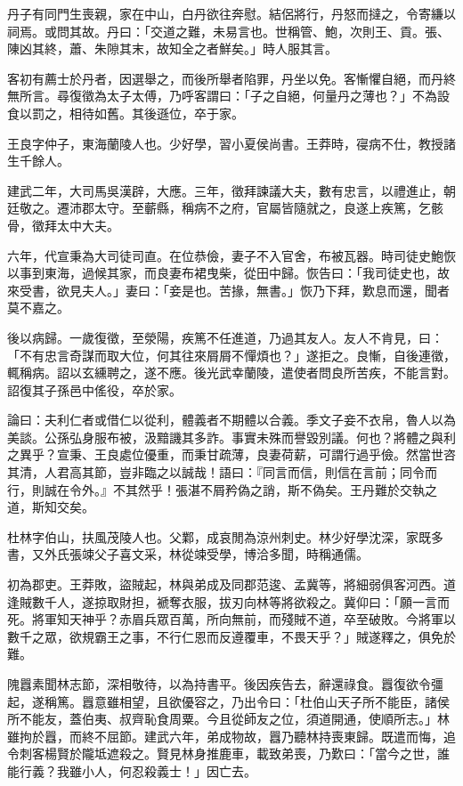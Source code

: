 \begin{pinyinscope}
丹子有同門生喪親，家在中山，白丹欲往奔慰。結侶將行，丹怒而撻之，令寄縑以祠焉。或問其故。丹曰：「交道之難，未易言也。世稱管、鮑，次則王、貢。張、陳凶其終，蕭、朱隙其末，故知全之者鮮矣。」時人服其言。

客初有薦士於丹者，因選舉之，而後所舉者陷罪，丹坐以免。客慚懼自絕，而丹終無所言。尋復徵為太子太傅，乃呼客謂曰：「子之自絕，何量丹之薄也？」不為設食以罰之，相待如舊。其後遜位，卒于家。

王良字仲子，東海蘭陵人也。少好學，習小夏侯尚書。王莽時，寑病不仕，教授諸生千餘人。

建武二年，大司馬吳漢辟，大應。三年，徵拜諫議大夫，數有忠言，以禮進止，朝廷敬之。遷沛郡太守。至蘄縣，稱病不之府，官屬皆隨就之，良遂上疾篤，乞骸骨，徵拜太中大夫。

六年，代宣秉為大司徒司直。在位恭儉，妻子不入官舍，布被瓦器。時司徒史鮑恢以事到東海，過候其家，而良妻布裙曳柴，從田中歸。恢告曰：「我司徒史也，故來受書，欲見夫人。」妻曰：「妾是也。苦掾，無書。」恢乃下拜，歎息而還，聞者莫不嘉之。

後以病歸。一歲復徵，至滎陽，疾篤不任進道，乃過其友人。友人不肯見，曰：「不有忠言奇謀而取大位，何其往來屑屑不憚煩也？」遂拒之。良慚，自後連徵，輒稱病。詔以玄纁聘之，遂不應。後光武幸蘭陵，遣使者問良所苦疾，不能言對。詔復其子孫邑中傜役，卒於家。

論曰：夫利仁者或借仁以從利，體義者不期體以合義。季文子妾不衣帛，魯人以為美談。公孫弘身服布被，汲黯譏其多詐。事實未殊而譽毀別議。何也？將體之與利之異乎？宣秉、王良處位優重，而秉甘疏薄，良妻荷薪，可謂行過乎儉。然當世咨其清，人君高其節，豈非臨之以誠哉！語曰：『同言而信，則信在言前；同令而行，則誠在令外。』不其然乎！張湛不屑矜偽之誚，斯不偽矣。王丹難於交執之道，斯知交矣。

杜林字伯山，扶風茂陵人也。父鄴，成哀閒為涼州刺史。林少好學沈深，家既多書，又外氏張竦父子喜文采，林從竦受學，博洽多聞，時稱通儒。

初為郡吏。王莽敗，盜賊起，林與弟成及同郡范逡、孟冀等，將細弱俱客河西。道逢賊數千人，遂掠取財担，褫奪衣服，拔刃向林等將欲殺之。冀仰曰：「願一言而死。將軍知天神乎？赤眉兵眾百萬，所向無前，而殘賊不道，卒至破敗。今將軍以數千之眾，欲規霸王之事，不行仁恩而反遵覆車，不畏天乎？」賊遂釋之，俱免於難。

隗囂素聞林志節，深相敬待，以為持書平。後因疾告去，辭還祿食。囂復欲令彊起，遂稱篤。囂意雖相望，且欲優容之，乃出令曰：「杜伯山天子所不能臣，諸侯所不能友，蓋伯夷、叔齊恥食周粟。今且從師友之位，須道開通，使順所志。」林雖拘於囂，而終不屈節。建武六年，弟成物故，囂乃聽林持喪東歸。既遣而悔，追令刺客楊賢於隴坻遮殺之。賢見林身推鹿車，載致弟喪，乃歎曰：「當今之世，誰能行義？我雖小人，何忍殺義士！」因亡去。


\end{pinyinscope}

